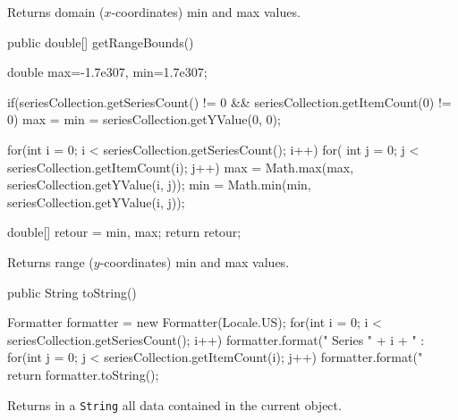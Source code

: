 \begin{tabb}
   Returns domain ($x$-coordinates) min and max values.
\end{tabb}
\begin{htmlonly}
\end{htmlonly}
\begin{code}

   public double[] getRangeBounds() \begin{hide} {
      double max=-1.7e307, min=1.7e307;

      if(seriesCollection.getSeriesCount() != 0 && seriesCollection.getItemCount(0) != 0)
         max = min = seriesCollection.getYValue(0, 0);

      for(int i = 0; i < seriesCollection.getSeriesCount(); i++) {
         for( int j = 0; j < seriesCollection.getItemCount(i); j++) {
            max = Math.max(max, seriesCollection.getYValue(i, j));
            min = Math.min(min, seriesCollection.getYValue(i, j));
         }
      }

      double[] retour = {min, max};
      return retour;
   }\end{hide}
\end{code}
\begin{tabb}
   Returns range ($y$-coordinates) min and max values.
\end{tabb}
\begin{htmlonly}
\end{htmlonly}
\begin{code}

   public String toString() \begin{hide} {
      Formatter formatter = new Formatter(Locale.US);
      for(int i = 0; i < seriesCollection.getSeriesCount(); i++) {
         formatter.format(" Series " + i + " : %
         for(int j = 0; j < seriesCollection.getItemCount(i); j++)
            formatter.format("%
      }
      return formatter.toString();
   }\end{hide}
\end{code}
\begin{tabb}
  Returns in a \texttt{String} all data contained in the current object.
\end{tabb}
\begin{htmlonly}
\end{htmlonly}

